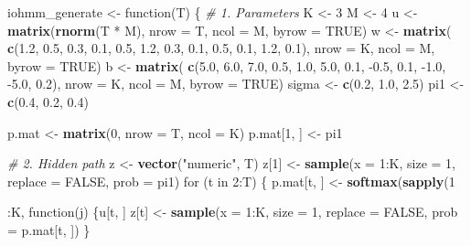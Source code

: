 \documentclass[]{article}
\newenvironment{Shaded}{\begin{snugshade}}{\end{snugshade}}
\newcommand{\KeywordTok}[1]{\textcolor[rgb]{0.13,0.29,0.53}{\textbf{{#1}}}}
\newcommand{\DataTypeTok}[1]{\textcolor[rgb]{0.13,0.29,0.53}{{#1}}}
\newcommand{\DecValTok}[1]{\textcolor[rgb]{0.00,0.00,0.81}{{#1}}}
\newcommand{\FloatTok}[1]{\textcolor[rgb]{0.00,0.00,0.81}{{#1}}}
\newcommand{\StringTok}[1]{\textcolor[rgb]{0.31,0.60,0.02}{{#1}}}
\newcommand{\CommentTok}[1]{\textcolor[rgb]{0.56,0.35,0.01}{\textit{{#1}}}}
\newcommand{\OtherTok}[1]{\textcolor[rgb]{0.56,0.35,0.01}{{#1}}}
\newcommand{\NormalTok}[1]{{#1}}
\begin{document}
{{{\begin{Shaded}
\begin{Highlighting}[]
\NormalTok{iohmm_generate <-}\StringTok{ }\NormalTok{function(T) \{}
  \CommentTok{# 1. Parameters}
  \NormalTok{K <-}\StringTok{ }\DecValTok{3}
  \NormalTok{M <-}\StringTok{ }\DecValTok{4}
  \NormalTok{u <-}\StringTok{ }\KeywordTok{matrix}\NormalTok{(}\KeywordTok{rnorm}\NormalTok{(T *}\StringTok{ }\NormalTok{M), }\DataTypeTok{nrow =} \NormalTok{T, }\DataTypeTok{ncol =} \NormalTok{M, }\DataTypeTok{byrow =} \OtherTok{TRUE}\NormalTok{)}
  \NormalTok{w <-}\StringTok{ }\KeywordTok{matrix}\NormalTok{(}
    \KeywordTok{c}\NormalTok{(}\FloatTok{1.2}\NormalTok{, }\FloatTok{0.5}\NormalTok{, }\FloatTok{0.3}\NormalTok{, }\FloatTok{0.1}\NormalTok{, }\FloatTok{0.5}\NormalTok{, }\FloatTok{1.2}\NormalTok{, }\FloatTok{0.3}\NormalTok{, }\FloatTok{0.1}\NormalTok{, }\FloatTok{0.5}\NormalTok{, }\FloatTok{0.1}\NormalTok{, }\FloatTok{1.2}\NormalTok{, }\FloatTok{0.1}\NormalTok{),}
    \DataTypeTok{nrow =} \NormalTok{K, }\DataTypeTok{ncol =} \NormalTok{M, }\DataTypeTok{byrow =} \OtherTok{TRUE}\NormalTok{)}
  \NormalTok{b <-}\StringTok{ }\KeywordTok{matrix}\NormalTok{(}
    \KeywordTok{c}\NormalTok{(}\FloatTok{5.0}\NormalTok{, }\FloatTok{6.0}\NormalTok{, }\FloatTok{7.0}\NormalTok{, }\FloatTok{0.5}\NormalTok{, }\FloatTok{1.0}\NormalTok{, }\FloatTok{5.0}\NormalTok{, }\FloatTok{0.1}\NormalTok{, -}\FloatTok{0.5}\NormalTok{, }\FloatTok{0.1}\NormalTok{, -}\FloatTok{1.0}\NormalTok{, -}\FloatTok{5.0}\NormalTok{, }\FloatTok{0.2}\NormalTok{),}
    \DataTypeTok{nrow =} \NormalTok{K, }\DataTypeTok{ncol =} \NormalTok{M, }\DataTypeTok{byrow =} \OtherTok{TRUE}\NormalTok{)}
  \NormalTok{sigma <-}\StringTok{ }\KeywordTok{c}\NormalTok{(}\FloatTok{0.2}\NormalTok{, }\FloatTok{1.0}\NormalTok{, }\FloatTok{2.5}\NormalTok{)}
  \NormalTok{pi1 <-}\StringTok{ }\KeywordTok{c}\NormalTok{(}\FloatTok{0.4}\NormalTok{, }\FloatTok{0.2}\NormalTok{, }\FloatTok{0.4}\NormalTok{)}
  
  \NormalTok{p.mat <-}\StringTok{ }\KeywordTok{matrix}\NormalTok{(}\DecValTok{0}\NormalTok{, }\DataTypeTok{nrow =} \NormalTok{T, }\DataTypeTok{ncol =} \NormalTok{K)}
  \NormalTok{p.mat[}\DecValTok{1}\NormalTok{, ] <-}\StringTok{ }\NormalTok{pi1}

  \CommentTok{# 2. Hidden path}
  \NormalTok{z <-}\StringTok{ }\KeywordTok{vector}\NormalTok{(}\StringTok{"numeric"}\NormalTok{, T)}
  \NormalTok{z[}\DecValTok{1}\NormalTok{] <-}\StringTok{ }\KeywordTok{sample}\NormalTok{(}\DataTypeTok{x =} \DecValTok{1}\NormalTok{:K, }\DataTypeTok{size =} \DecValTok{1}\NormalTok{, }\DataTypeTok{replace =} \OtherTok{FALSE}\NormalTok{, }\DataTypeTok{prob =} \NormalTok{pi1)}
  \NormalTok{for (t in }\DecValTok{2}\NormalTok{:T) \{}
    \NormalTok{p.mat[t, ] <-}\StringTok{ }\KeywordTok{softmax}\NormalTok{(}\KeywordTok{sapply}\NormalTok{(}\DecValTok{1}\NormalTok{:K, function(j) \{u[t, ] %
    \NormalTok{z[t] <-}\StringTok{ }\KeywordTok{sample}\NormalTok{(}\DataTypeTok{x =} \DecValTok{1}\NormalTok{:K, }\DataTypeTok{size =} \DecValTok{1}\NormalTok{, }\DataTypeTok{replace =} \OtherTok{FALSE}\NormalTok{, }\DataTypeTok{prob =} \NormalTok{p.mat[t, ])}
  \NormalTok{\}}

}
\end{Highlighting}
\end{Shaded}}}}
\end{document}
